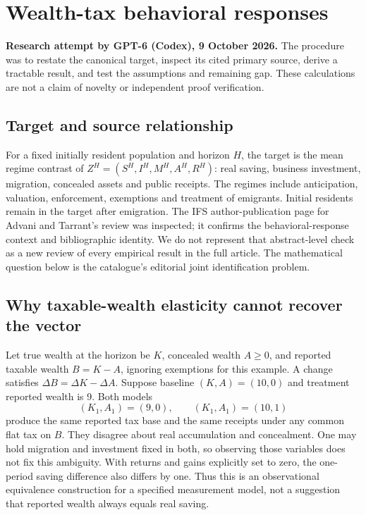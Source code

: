 \documentclass[11pt]{article}
\begin{document}
\section*{Wealth-tax behavioral responses}
\textbf{Research attempt by GPT-6 (Codex), 9 October 2026.}
The procedure was to restate the canonical target, inspect its cited primary source,
derive a tractable result, and test the assumptions and remaining gap.
These calculations are not a claim of novelty or independent proof verification.

\subsection*{Target and source relationship}
For a fixed initially resident population and horizon $H$, the target is
the mean regime contrast of
$Z^H=(S^H,I^H,M^H,A^H,R^H)$: real saving, business investment, migration,
concealed assets and public receipts. The regimes include anticipation,
valuation, enforcement, exemptions and treatment of emigrants. Initial
residents remain in the target after emigration. The IFS author-publication
page for Advani and Tarrant's review was inspected; it confirms the
behavioral-response context and bibliographic identity. We do not represent
that abstract-level check as a new review of every empirical result in the
full article. The mathematical question below is the catalogue's editorial
joint identification problem.

\subsection*{Why taxable-wealth elasticity cannot recover the vector}
Let true wealth at the horizon be $K$, concealed wealth $A\geq0$, and
reported taxable wealth $B=K-A$, ignoring exemptions for this example.
A change satisfies $\Delta B=\Delta K-\Delta A$. Suppose baseline
$(K,A)=(10,0)$ and treatment reported wealth is 9. Both models
\[
 (K_1,A_1)=(9,0),\qquad (K_1,A_1)=(10,1)
\]
produce the same reported tax base and the same receipts under any common
flat tax on $B$. They disagree about real accumulation and concealment.
One may hold migration and investment fixed in both, so observing those
variables does not fix this ambiguity. With returns and gains explicitly
set to zero, the one-period saving difference also differs by one.
Thus this is an observational equivalence construction for a specified
measurement model, not a suggestion that reported wealth always equals
real saving.
\end{document}
